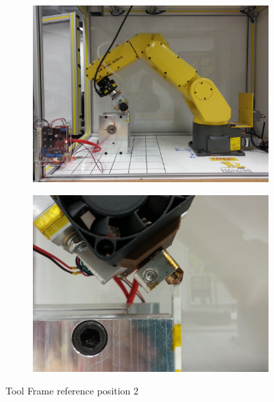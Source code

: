 \begin{figure}
    \centering
    \begin{subfigure}{.5\textwidth}
        \centering
            \includegraphics[width=.8\linewidth]{figures/tool-pt-2}
    \end{subfigure}%
    \begin{subfigure}{.5\textwidth}
        \centering
        \includegraphics[width=.8\linewidth]{figures/tool-pt-2-close}
    \end{subfigure}
    \caption{Tool Frame reference position 2}
    \label{fig:tool-pt-2}
\end{figure}

